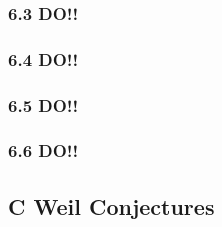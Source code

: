 \documentclass[12pt]{article}
\begin{document}
\subsubsection{6.3 DO!!}


\subsubsection{6.4 DO!!}

\subsubsection{6.5 DO!!}

\subsubsection{6.6 DO!!}


\subsection{C Weil Conjectures}
\end{document}
